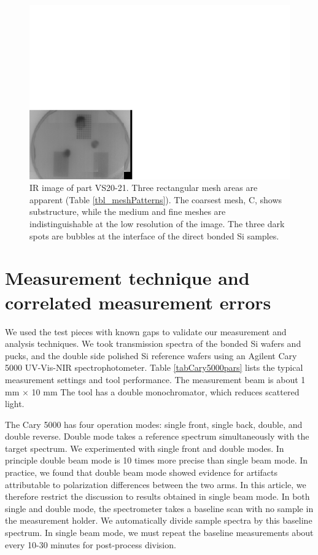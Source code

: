 \documentclass[osajnl,preprint,showpacs,superscriptaddress,12pt]{revtex4-1} %
\begin{document}
\begin{figure}[htbp]
\includegraphics[width=0.4\columnwidth]{figs/VS2021_IR_image.pdf}
\caption{
\label{figVS2021_IR_image}
IR image of part VS20-21. Three rectangular mesh areas are apparent (Table \ref{tbl_meshPatterns}).  The coarsest mesh, C, shows substructure, while the medium and fine meshes are indistinguishable at the low resolution of the image.  The three dark spots are bubbles at the interface of the direct bonded Si samples.}
\end{figure}


\section{Measurement technique and correlated measurement errors}
\label{sec_aboutErrors}

We used the test pieces with known gaps to validate our measurement and analysis techniques.  We took transmission spectra of the bonded Si wafers and pucks, and the double side polished Si reference wafers using an Agilent Cary 5000 UV-Vis-NIR spectrophotometer.  Table \ref{tabCary5000pars} lists the typical measurement settings and tool performance.  The measurement beam is about 1 mm $\times$ 10 mm The tool has a double monochromator, which reduces scattered light.

The Cary 5000 has four operation modes: single front, single back, double, and double reverse.  Double mode takes a reference spectrum simultaneously with the target spectrum.  We experimented with single front and double modes.  In principle double beam mode is 10 times more precise than single beam mode.  In practice, we found that double beam mode showed evidence for artifacts attributable to polarization differences between the two arms.  In this article, we therefore restrict the discussion to results obtained in single beam mode.  In both single and double mode, the spectrometer takes a baseline scan with no sample in the measurement holder.  We automatically divide sample spectra by this baseline spectrum.  In single beam mode, we must repeat the baseline measurements about every 10-30 minutes for post-process division.
\end{document}
